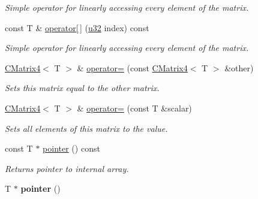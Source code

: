 \begin{DoxyCompactItemize}
\begin{DoxyCompactList}\small\item\em Simple operator for linearly accessing every element of the matrix. \end{DoxyCompactList}\item 
const T \& \hyperlink{classirr_1_1core_1_1CMatrix4_a1c7a81521e81280c31b8ae3397d1fffe}{operator\mbox{[}$\,$\mbox{]}} (\hyperlink{namespaceirr_a0416a53257075833e7002efd0a18e804}{u32} index) const \hypertarget{classirr_1_1core_1_1CMatrix4_a1c7a81521e81280c31b8ae3397d1fffe}{}\label{classirr_1_1core_1_1CMatrix4_a1c7a81521e81280c31b8ae3397d1fffe}

\begin{DoxyCompactList}\small\item\em Simple operator for linearly accessing every element of the matrix. \end{DoxyCompactList}\item 
\hyperlink{classirr_1_1core_1_1CMatrix4}{C\+Matrix4}$<$ T $>$ \& \hyperlink{classirr_1_1core_1_1CMatrix4_a47571eb3acae9a6aa330a03edcea7896}{operator=} (const \hyperlink{classirr_1_1core_1_1CMatrix4}{C\+Matrix4}$<$ T $>$ \&other)\hypertarget{classirr_1_1core_1_1CMatrix4_a47571eb3acae9a6aa330a03edcea7896}{}\label{classirr_1_1core_1_1CMatrix4_a47571eb3acae9a6aa330a03edcea7896}

\begin{DoxyCompactList}\small\item\em Sets this matrix equal to the other matrix. \end{DoxyCompactList}\item 
\hyperlink{classirr_1_1core_1_1CMatrix4}{C\+Matrix4}$<$ T $>$ \& \hyperlink{classirr_1_1core_1_1CMatrix4_aa77c0ec30f4e42f7281392440898e9e3}{operator=} (const T \&scalar)\hypertarget{classirr_1_1core_1_1CMatrix4_aa77c0ec30f4e42f7281392440898e9e3}{}\label{classirr_1_1core_1_1CMatrix4_aa77c0ec30f4e42f7281392440898e9e3}

\begin{DoxyCompactList}\small\item\em Sets all elements of this matrix to the value. \end{DoxyCompactList}\item 
const T $\ast$ \hyperlink{classirr_1_1core_1_1CMatrix4_a11a3ffa3eb0987030e7a8758dee8965a}{pointer} () const \hypertarget{classirr_1_1core_1_1CMatrix4_a11a3ffa3eb0987030e7a8758dee8965a}{}\label{classirr_1_1core_1_1CMatrix4_a11a3ffa3eb0987030e7a8758dee8965a}

\begin{DoxyCompactList}\small\item\em Returns pointer to internal array. \end{DoxyCompactList}\item 
T $\ast$ {\bfseries pointer} ()\hypertarget{classirr_1_1core_1_1CMatrix4_a2d9b231425d1b8abddb9e1e997fbf2ea}{}\label{classirr_1_1core_1_1CMatrix4_a2d9b231425d1b8abddb9e1e997fbf2ea}


\end{DoxyCompactItemize}
